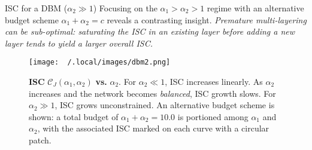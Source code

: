 \documentclass[8pt]{beamer}
\begin{document}
\begin{frame}[label={sec:org7428d27}]{ISC for a DBM (\(\alpha_{2} \gg 1\))}
Focusing on the \(\alpha_1 > \alpha_2 > 1\) regime with an alternative budget scheme \(\alpha_{1} + \alpha_{2} = c\) reveals a contrasting insight. \emph{Premature multi-layering can be sub-optimal: saturating the ISC in an existing layer before adding a new layer tends to yield a larger overall ISC.}
\begin{figure}[htbp]
   \centering
   \texttt{[image: ~/.local/images/dbm2.png]}
   \caption{\textbf{ISC} \(\mathcal{C}_{J} (\alpha_{1}, \alpha_{2})\) \textbf{vs.} \(\alpha_{2}\). For \( \alpha_2 \ll 1 \), ISC increases linearly. As \( \alpha_2 \) increases and the network becomes \emph{balanced}, ISC growth slows. For \( \alpha_2 \gg 1 \), ISC grows unconstrained. An alternative budget scheme is shown: a total budget of \( \alpha_1 + \alpha_2 = 10.0 \) is portioned among \(\alpha_1\) and \(\alpha_2\), with the associated ISC marked on each curve with a circular patch.}
\label{fig:sub2}
\end{figure}
\end{frame}
\end{document}
